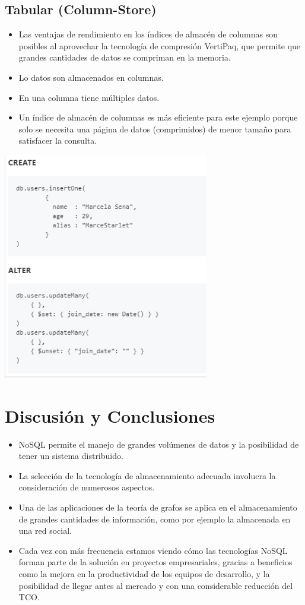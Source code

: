 \documentclass[%
 reprint,
 amsmath,amssymb,
 aps,
]{revtex4-1}
\begin{document}
\subsection{Tabular (Column-Store)}
\begin{itemize}
		\item Las ventajas de rendimiento en los índices de almacén de columnas son posibles al aprovechar la tecnología de compresión VertiPaq, que permite que grandes cantidades de datos se compriman en la memoria.
		\item Lo datos son almacenados en columnas.
		\item En una columna tiene múltiples datos.
                     \item Un índice de almacén de columnas es más eficiente para este ejemplo porque solo se necesita una página de datos (comprimidos) de menor tamaño para satisfacer la consulta.
	          \end{itemize} 
 \begin{center}
	\includegraphics[width=9cm]{./Imagenes/5}
\end{center}	

\section{Discusión y Conclusiones}\label{sec:5}
	\begin{itemize}
		\item NoSQL permite el manejo de grandes volúmenes de datos y la posibilidad de tener un sistema distribuido.
		\item La selección de la tecnología de almacenamiento adecuada involucra la consideración de numerosos aspectos.
\item Una de las aplicaciones de la teoría de grafos se aplica en el almacenamiento de grandes cantidades de información, como por ejemplo la almacenada en una red social. 
\item Cada vez con más frecuencia estamos viendo cómo las tecnologías NoSQL forman parte de la solución en proyectos empresariales, gracias a beneficios como la mejora en la productividad de los equipos de desarrollo, y la posibilidad de llegar antes al mercado y con una considerable reducción del TCO.
	\end{itemize}
\end{document}
